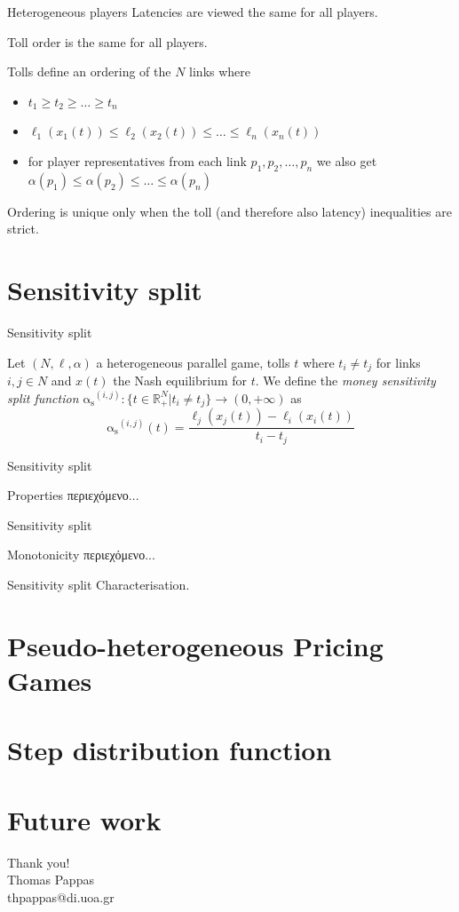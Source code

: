 \documentclass{beamer}
\newcommand{\as}{\mathrm{\alpha_s}}
\newcommand{\R}{\mathbb{R}}
\begin{document}
\begin{frame}{Heterogeneous players}
	Latencies are viewed the same for all players.

	Toll order is the same for all players.

	Tolls define an ordering of the $N$ links where
	\begin{itemize}
		\item $t_1 \ge t_2 \ge \dots \ge t_n$
		\item $\ell_1(x_1(t)) \le \ell_2(x_2(t)) \le \dots \le \ell_n(x_n(t))$
		\item for player representatives from each link $p_1, p_2, \dots, p_n$ we also get $\alpha(p_1) \le \alpha(p_2) \le \dots \le \alpha(p_n)$
	\end{itemize}
	Ordering is unique only when the toll (and therefore also latency) inequalities are strict.
\end{frame}


\section{Sensitivity split}

\begin{frame}{Sensitivity split}
	\begin{definition}
		Let $(N, \ell, \alpha)$ a heterogeneous parallel game, tolls $t$ where $t_i \ne t_j$ for links $i, j \in N$ and $x(t)$ the Nash equilibrium for $t$.
		We define the \textit{money sensitivity split function} $\as^{(i, j)}: \{t \in \R_+^N|t_i \ne t_j\} \rightarrow (0, +\infty)$ as
		\[\as^{(i, j)}(t) = \frac{\ell_j(x_j(t)) - \ell_i(x_i(t))}{t_i - t_j}\]
	\end{definition}
\end{frame}

\begin{frame}{Sensitivity split}
	\begin{block}{Properties}
		περιεχόμενο...
	\end{block}
\end{frame}

\begin{frame}{Sensitivity split}
	\begin{block}{Monotonicity}
		περιεχόμενο...
	\end{block}
\end{frame}

\begin{frame}{Sensitivity split}
	Characterisation.
\end{frame}


\section{Pseudo-heterogeneous Pricing Games}

\section{Step distribution function}

\section{Future work}

\begin{frame}{}
	\centering
    \huge Thank you!\\
    \normalsize Thomas Pappas\\
    thpappas@di.uoa.gr
\end{frame}
\end{document}
